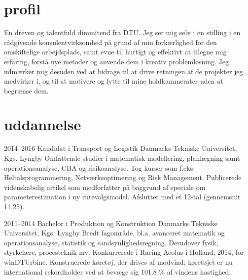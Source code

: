 \documentclass[]{../friggeri-cv} %
\begin{document}

\section{profil}
En dreven og talentfuld dimmitend fra DTU. Jeg ser mig selv i en stilling i en rådgivende konsulentvirksomhed på grund af  min forkærlighed for den omskiftelige arbejdsplads, samt evne til hurtigt og effektivt at tilegne mig erfaring, forstå  nye metoder og anvende dem  i kreativ problemløsning. Jeg udmærker mig desuden ved  at bidrage til at drive retningen af de projekter jeg medvirker i, og til at motivere og lytte til mine holdkammerater   uden at begrænse dem.

\section{uddannelse}
\begin{entrylist}
\entry
{2014--2016}
{Kandidat {\normalfont i Transport og Logistik}}
{Danmarks Tekniske Universitet, Kgs. Lyngby}
{Omfattende studier i matematisk modellering, planlægning samt operationsanalyse, CBA og risikoanalyse. Tog kurser som f.eks. Heltalsprogrammering, Netværksoptimering og Risk Management. Publicerede videnskabelig artikel  som medforfatter på baggrund af speciale om parameterestimation i ny rutevalgsmodel. Afsluttet med et 12-tal (gennemsnit 11.25).
}


\entry
{2011--2014}
{Bachelor {\normalfont i Produktion og Konstruktion}}
{Danmarks Tekniske Universitet, Kgs. Lyngby}
{Bredt fagområde, bl.a. avanceret matematik og operationsanalyse, statistik og sandsynlighedsregning. Derudover fysik, styrkelære, procesteknik mv. Konkurrerede i Racing Aeolus  i Holland, 2014, for winDTUrbine. Konstruerede køretøj, der drives af modvind; køretøjet er nu international rekordholder ved at bevæge sig 101.8 \% af vindens hastighed.}

\end{entrylist}

\end{document}
